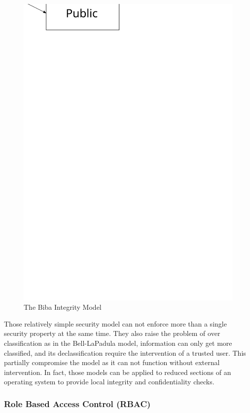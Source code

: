 \documentclass[pdftex,a4paper,titlepage,11pt]{article}
\begin{document}
\begin{figure}[h]
	\centering
	\includegraphics[scale=0.5]{biba}
	\caption{The Biba Integrity Model}
\end{figure}

\bigskip

Those relatively simple security model can not enforce more than a single
security property at the same time. They also raise the problem of over
classification as in the Bell-LaPadula model, information can only get more
classified, and its declassification require the intervention of a trusted
user. This partially compromise the model as it can not function without
external intervention. In fact, those models can be applied to reduced sections
of an operating system to provide local integrity and confidentiality checks.

\subsubsection{Role Based Access Control (RBAC)}
\end{document}

